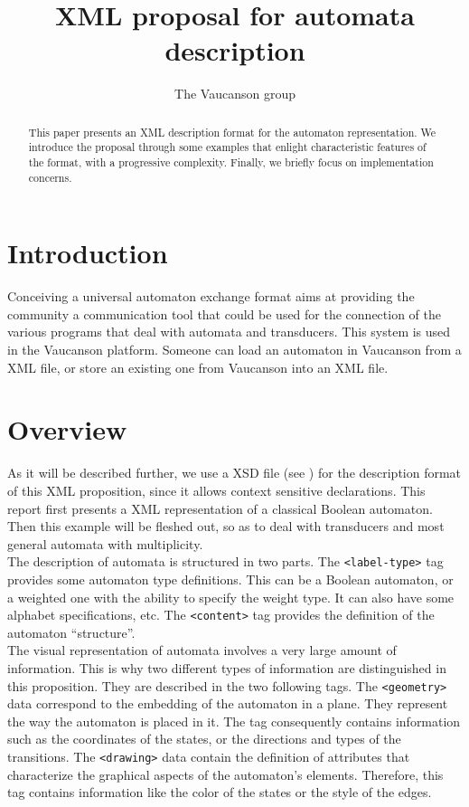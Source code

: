 \documentclass[a4paper]{article}
\newcommand{\Vauc}{{\sc Vaucanson}\xspace}
\def\typetag{\texttt{<label-type>}}
\def\contenttag{\texttt{<content>}}
\def\geometrytag{\texttt{<geometry>}}
\def\drawingtag{\texttt{<drawing>}}
\begin{document}
\title{XML proposal for automata description}

\author{The \Vauc group}

\maketitle{}

\begin{abstract}
This paper presents an XML description format for the automaton
representation. We introduce the proposal through some examples that
enlight characteristic features of the format, with a progressive
complexity. Finally, we briefly focus on implementation concerns.
\end{abstract}

\section*{Introduction}

Conceiving a universal automaton exchange format aims at
providing the community a communication tool that could be used
for the connection of the various programs that deal with
automata and transducers.
This system is used in the Vaucanson platform. Someone can load an automaton in
Vaucanson from a XML file, or store an existing one from Vaucanson into an XML file.

\section{Overview}

As it will be described further, we use a XSD file (see \cite{XSD}) for the description
format of this XML proposition, since it allows context sensitive declarations.
This report first presents a XML representation of a classical Boolean
automaton. Then this example will be fleshed out, so as to deal with transducers
and most general automata with multiplicity.\\

The description of automata is structured in two parts.  The
\typetag{} tag provides some automaton type definitions. This can be a Boolean
automaton, or a weighted one with the ability to specify the weight type.
It can also have some alphabet specifications, etc. The \contenttag{} tag provides
the definition of the automaton ``structure''.\\

The visual representation of automata involves a very large amount of
information. This is why two different types of information are
distinguished in this proposition. They are described in the two following tags.
 The \geometrytag{} data correspond to the embedding
of the automaton in a plane. They represent the way the automaton is placed in
it. The tag consequently contains information such as the coordinates of the
states, or the directions and types of the transitions. The \drawingtag{} data
contain the definition of attributes that characterize the graphical aspects of the
automaton's elements. Therefore, this tag contains information like the color of the
states or the style of the edges. \\
\end{document}
